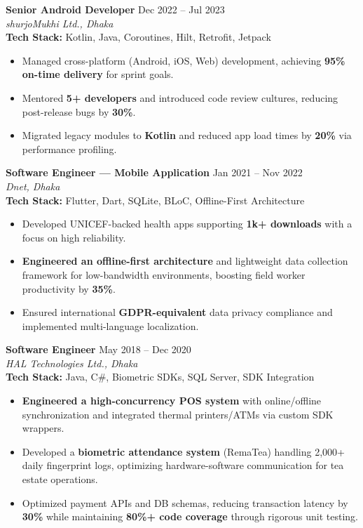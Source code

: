 \documentclass[10pt,a4paper]{article}
\begin{document}
\vspace{6pt}

\textbf{Senior Android Developer} \hfill Dec 2022 -- Jul 2023 \\
\textit{shurjoMukhi Ltd., Dhaka} \\
\textbf{Tech Stack:} Kotlin, Java, Coroutines, Hilt, Retrofit, Jetpack
\begin{itemize}
    \item Managed cross-platform (Android, iOS, Web) development, achieving \textbf{95\% on-time delivery} for sprint goals.
    \item Mentored \textbf{5+ developers} and introduced code review cultures, reducing post-release bugs by \textbf{30\%}.
    \item Migrated legacy modules to \textbf{Kotlin} and reduced app load times by \textbf{20\%} via performance profiling.
\end{itemize}

\vspace{6pt}

\textbf{Software Engineer — Mobile Application} \hfill Jan 2021 -- Nov 2022 \\
\textit{Dnet, Dhaka} \\
\textbf{Tech Stack:} Flutter, Dart, SQLite, BLoC, Offline-First Architecture
\begin{itemize}
    \item Developed UNICEF-backed health apps supporting \textbf{1k+ downloads} with a focus on high reliability.
\item \textbf{Engineered an offline-first architecture} and lightweight data collection framework for low-bandwidth environments, boosting field worker productivity by \textbf{35\%}.
    \item Ensured international \textbf{GDPR-equivalent} data privacy compliance and implemented multi-language localization.
\end{itemize}

\vspace{6pt}

\textbf{Software Engineer} \hfill May 2018 -- Dec 2020 \\
\textit{HAL Technologies Ltd., Dhaka} \\
\textbf{Tech Stack:} Java, C\#, Biometric SDKs, SQL Server, SDK Integration
\begin{itemize}
    \item \textbf{Engineered a high-concurrency POS system} with online/offline synchronization and integrated thermal printers/ATMs via custom SDK wrappers.
    \item Developed a \textbf{biometric attendance system} (RemaTea) handling 2,000+ daily fingerprint logs, optimizing hardware-software communication for tea estate operations.
    \item Optimized payment APIs and DB schemas, reducing transaction latency by \textbf{30\%} while maintaining \textbf{80\%+ code coverage} through rigorous unit testing.
\end{itemize}
\end{document}
